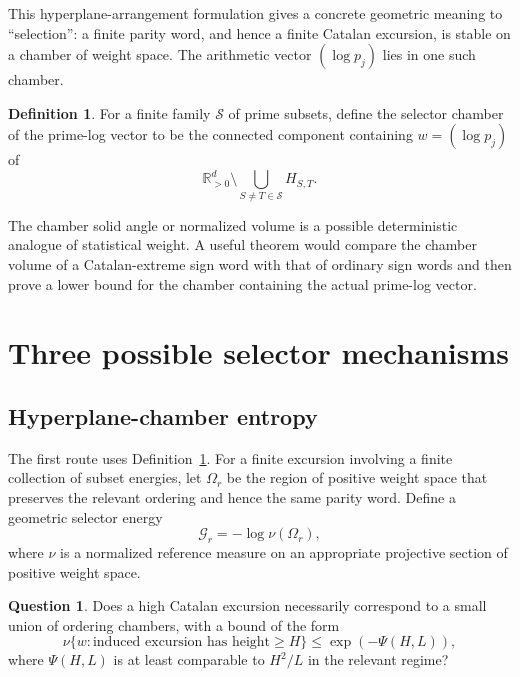 \documentclass[11pt]{amsart}
\numberwithin{equation}{section}
\theoremstyle{plain}
\theoremstyle{definition}
\newtheorem{definition}[theorem]{Definition}
\newtheorem{question}[theorem]{Question}
\theoremstyle{remark}
\newcommand{\R}{\mathbb{R}}
\begin{document}
This hyperplane-arrangement formulation gives a concrete geometric meaning to ``selection'': a finite parity word, and hence a finite Catalan excursion, is stable on a chamber of weight space.  The arithmetic vector $(\log p_j)$ lies in one such chamber.

\begin{definition}
\label{def:selector_chamber}
For a finite family $\mathcal S$ of prime subsets, define the selector chamber of the prime-log vector to be the connected component containing $w=(\log p_j)$ of
\begin{equation}
\R_{>0}^{d}
\setminus
\bigcup_{S\ne T\in\mathcal S}H_{S,T}.
\label{eq:selector_chamber_definition}
\end{equation}
\end{definition}

The chamber solid angle or normalized volume is a possible deterministic analogue of statistical weight.  A useful theorem would compare the chamber volume of a Catalan-extreme sign word with that of ordinary sign words and then prove a lower bound for the chamber containing the actual prime-log vector.

\section{Three possible selector mechanisms}
\label{sec:selector_mechanisms}

\subsection{Hyperplane-chamber entropy}
\label{subsec:chamber_entropy}

The first route uses Definition~\ref{def:selector_chamber}.  For a finite excursion involving a finite collection of subset energies, let $\Omega_r$ be the region of positive weight space that preserves the relevant ordering and hence the same parity word.  Define a geometric selector energy
\begin{equation}
\mathcal{G}_r
=
-\log \nu(\Omega_r),
\label{eq:geometric_selector_energy}
\end{equation}
where $\nu$ is a normalized reference measure on an appropriate projective section of positive weight space.

\begin{question}
\label{question:chamber_vs_catalan_height}
Does a high Catalan excursion necessarily correspond to a small union of ordering chambers, with a bound of the form
\begin{equation}
\nu\{w:\text{induced excursion has height}\ge H\}
\le
\exp\!\left(-\Psi(H,L)\right),
\label{eq:chamber_height_rate}
\end{equation}
where $\Psi(H,L)$ is at least comparable to $H^2/L$ in the relevant regime?
\end{question}
\end{document}
